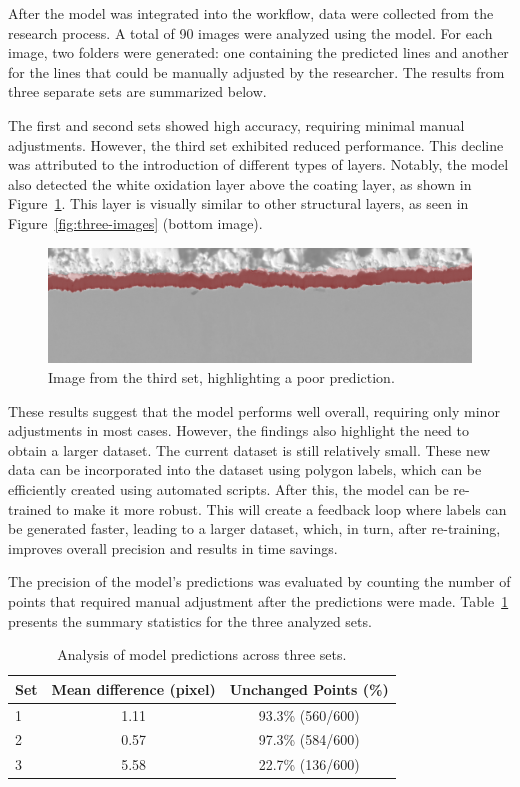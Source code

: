 After the model was integrated into the workflow, data were collected from the research process. A total of 90 images were analyzed using the model. For each image, two folders were generated: one containing the predicted lines and another for the lines that could be manually adjusted by the researcher. The results from three separate sets are summarized below.

The first and second sets showed high accuracy, requiring minimal manual adjustments. However, the third set exhibited reduced performance. This decline was attributed to the introduction of different types of layers. Notably, the model also detected the white oxidation layer above the coating layer, as shown in Figure~\ref{fig:ox}. This layer is visually similar to other structural layers, as seen in Figure~\ref{fig:three-images} (bottom image).

\begin{figure}[H]
    \centering
    \includegraphics[width=0.8\linewidth]{PICTURES/wrongPred.png}
    \caption{Image from the third set, highlighting a poor prediction.}
    \label{fig:ox}
\end{figure}

These results suggest that the model performs well overall, requiring only minor adjustments in most cases. However, the findings also highlight the need to obtain a larger dataset. The current dataset is still relatively small. These new data can be incorporated into the dataset using polygon labels, which can be efficiently created using automated scripts. After this, the model can be re-trained to make it more robust. This will create a feedback loop where labels can be generated faster, leading to a larger dataset, which, in turn, after re-training, improves overall precision and results in time savings.

The precision of the model's predictions was evaluated by counting the number of points that required manual adjustment after the predictions were made. Table~\ref{tab:results} presents the summary statistics for the three analyzed sets.

\begin{table}[H]
    \centering
    \caption{Analysis of model predictions across three sets.}

    \begin{tabular}{lcc}
        \toprule
        \textbf{Set} & \textbf{Mean difference (pixel)}  & \textbf{Unchanged Points (\%)} \\
        \midrule
        1 & 1.11  & 93.3\% (560/600) \\
        2 & 0.57  & 97.3\% (584/600) \\
        3 & 5.58  & 22.7\% (136/600) \\
        \bottomrule
    \end{tabular}
    \label{tab:results}

\end{table}


